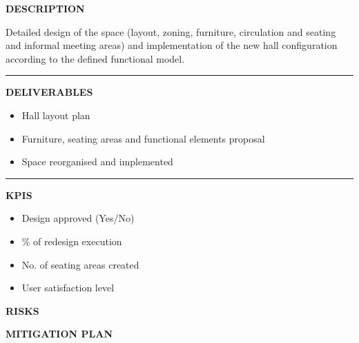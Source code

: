 \documentclass[11pt,a4paper]{scrreprt}
\newcommand{\fieldlabel}[1]{%
  {\footnotesize\sffamily\bfseries\color{mutedcolor}\MakeUppercase{#1}}\par\nopagebreak[4]
}
\newcommand{\fieldsep}{\vspace{3pt}\noindent\textcolor{bordercolor}{\rule{\linewidth}{0.4pt}}\vspace{3pt}\par}
\begin{document}
\begin{tcolorbox}[pabox={espcolor}{A.P.1.2 \enspace\textbullet\enspace Design and Implementation of the Hall Layout and Seating Areas}]

\fieldlabel{Description}
{\small Detailed design of the space (layout, zoning, furniture, circulation and seating and informal meeting areas) and implementation of the new hall configuration according to the defined functional model.}\par
\fieldsep
\fieldlabel{Deliverables}
{\small \begin{itemize}[noitemsep,topsep=2pt]
\item Hall layout plan
\item Furniture, seating areas and functional elements proposal
\item Space reorganised and implemented
\end{itemize}}\par
\fieldsep
\fieldlabel{KPIs}
{\small \begin{itemize}[noitemsep,topsep=2pt]
\item Design approved (Yes/No)
\item \% of redesign execution
\item No. of seating areas created
\item User satisfaction level
\end{itemize}}\par
\end{tcolorbox}
\begin{tcolorbox}[riskbox]
{\footnotesize\sffamily\bfseries\color{red!50!black} RISKS}\par{}
\end{tcolorbox}
\begin{tcolorbox}[mitbox]
{\footnotesize\sffamily\bfseries\color{green!40!black} MITIGATION PLAN}\par{}
\end{tcolorbox}
\vspace{8pt}
\end{document}

